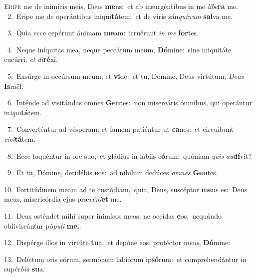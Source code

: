 \lettrine{\initial\textcolor{\initialcolor}{E}}{ripe} me de inimícis meis, Deus \textbf{me}\-us:~\star et ab insurgéntibus in me \textit{lí}\-\textit{be}\textbf{ra} me.\\
{\numbfont\textcolor{\numbcolor}{~2.}}~Eripe me de operántibus iniqui\-\textbf{tá}\-tem:~\star et de viris sán\-\textit{gui}\-\textit{num} \textbf{sal}\-va me.\par
{\numbfont\textcolor{\numbcolor}{~3.}}~Quia ecce cepérunt ánimam \textbf{me}\-am:~\star irruérunt \textit{in} \textit{me} \textbf{for}\-tes.\par
{\numbfont\textcolor{\numbcolor}{~4.}}~Neque iníquitas mea, neque peccátum meum, \textbf{Dó}\-mine:~\star sine iniquitáte cucúrri, \textit{et} \textit{di}\-\textbf{ré}xi.\par
{\numbfont\textcolor{\numbcolor}{~5.}}~Exsúrge in occúrsum meum, et \textbf{vi}\-de:~\star et tu, Dómine, Deus virtútum, \textit{De}\-\textit{us} \textbf{Is}\-raël.\par
{\numbfont\textcolor{\numbcolor}{~6.}}~Inténde ad visitándas omnes \textbf{Gen}\-tes:~\star non misereáris ómnibus, qui operántur in\-\textit{i}\-\textit{qui}\textbf{tá}tem.\par
{\numbfont\textcolor{\numbcolor}{~7.}}~Converténtur ad vésperam: et famem patiéntur ut \textbf{ca}\-nes:~\star et circuíbunt \textit{ci}\-\textit{vi}\textbf{tá}tem.\par
{\numbfont\textcolor{\numbcolor}{~8.}}~Ecce loquéntur in ore suo,~\dagger et gládius in lábiis e\-\textbf{ó}\-rum:~\star quóniam \textit{quis} \textit{au}\-\textbf{dí}vit?\par
{\numbfont\textcolor{\numbcolor}{~9.}}~Et tu, Dómine, deridébis \textbf{e}\-os:~\star ad níhilum dedúces \textit{om}\-\textit{nes} \textbf{Gen}\-tes.\par
{\numbfont\textcolor{\numbcolor}{10.}}~Fortitúdinem meam ad te custódiam,~\dagger quia, Deus, suscéptor \textbf{me}\-us es:~\star Deus meus, misericórdia ejus præ\-\textit{vé}\-\textit{ni}\textbf{et} me.\par
{\numbfont\textcolor{\numbcolor}{11.}}~Deus osténdet mihi super inimícos meos, ne occídas \textbf{e}\-os:~\star nequándo obliviscántur pó\-\textit{pu}\-\textit{li} \textbf{me}\-i.\par
{\numbfont\textcolor{\numbcolor}{12.}}~Dispérge illos in virtúte \textbf{tu}\-a:~\star et depóne eos, protéctor \textit{me}\-\textit{us}, \textbf{Dó}\-mine:\par
{\numbfont\textcolor{\numbcolor}{13.}}~Delíctum oris eórum, sermónem labiórum ip\-\textbf{só}\-rum:~\star et comprehendántur in supér\-\textit{bi}\-\textit{a} \textbf{su}\-a.\par

